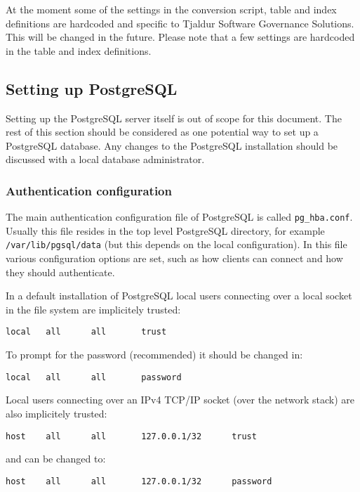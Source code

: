 \documentclass[10pt,a4paper]{article}
\begin{document}
At the moment some of the settings in the conversion script, table and index
definitions are hardcoded and specific to Tjaldur Software Governance
Solutions. This will be changed in the future. Please note that a few settings
are hardcoded in the table and index definitions.

\subsection{Setting up PostgreSQL}

Setting up the PostgreSQL server itself is out of scope for this document. The
rest of this section should be considered as one potential way to set up a
PostgreSQL database. Any changes to the PostgreSQL installation should be
discussed with a local database administrator.

\subsubsection{Authentication configuration}

The main authentication configuration file of PostgreSQL is called
\texttt{pg\_hba.conf}. Usually this file resides in the top level PostgreSQL
directory, for example \texttt{/var/lib/pgsql/data} (but this depends on the
local configuration). In this file various configuration options are set, such
as how clients can connect and how they should authenticate.

In a default installation of PostgreSQL local users connecting over a local socket
in the file system are implicitely trusted:

\begin{verbatim}
local   all      all       trust
\end{verbatim}

To prompt for the password (recommended) it should be changed in:

\begin{verbatim}
local   all      all       password
\end{verbatim}

Local users connecting over an IPv4 TCP/IP socket (over the network stack) are
also implicitely trusted:

\begin{verbatim}
host    all      all       127.0.0.1/32      trust
\end{verbatim}

and can be changed to:

\begin{verbatim}
host    all      all       127.0.0.1/32      password
\end{verbatim}
\end{document}

